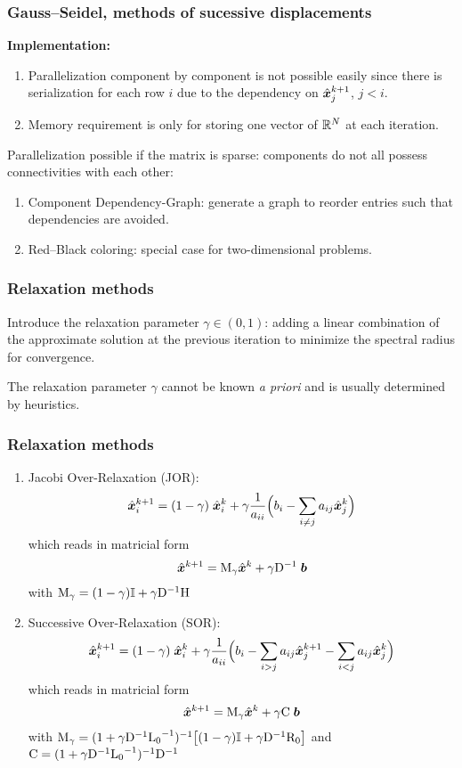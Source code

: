 \begin{frame}
  \frametitle{Gauss--Seidel, methods of sucessive displacements}

\medskip
\textbf{Implementation:}
\begin{enumerate}
\item Parallelization component by component is not possible easily since there is serialization for each row $i$ due to the dependency on $\hat{\boldsymbol x}_j^{k+1}$, $j < i$.
\item Memory requirement is only for storing one vector of ${\mathbb{R}^N}$ at each iteration.
\end{enumerate}

\medskip
Parallelization possible if the matrix is sparse: components do not all possess connectivities with each other:
\begin{enumerate}
\item Component Dependency-Graph: generate a graph to reorder entries such that dependencies are avoided.
\item Red--Black coloring: special case for two-dimensional problems.
\end{enumerate}

\end{frame}

\begin{frame}
  \frametitle{Relaxation methods}

Introduce the relaxation parameter $\gamma \in (0,1)$: adding a linear combination of the approximate solution at the previous iteration to minimize the spectral radius for convergence.

\medskip
The relaxation parameter $\gamma$ cannot be known \textit{a priori} and is usually determined by heuristics.

\end{frame}

\begin{frame}
  \frametitle{Relaxation methods}

\begin{enumerate}
\item Jacobi Over-Relaxation (JOR):
\begin{equation}
\hat{\boldsymbol x}^{k+1}_i = (1 - \gamma)\;\hat{\boldsymbol x}^{k}_i + \gamma \frac{1}{a_{ii}}\Bigl( b_i - \sum_{i\neq j} a_{ij} \hat{\boldsymbol x}^{k}_j \Bigr)
\end{equation}
which reads in matricial form
\[
\hat{\boldsymbol x}^{k+1} = {\mathrm M}_\gamma \hat{\boldsymbol x}^{k} + \gamma{\mathrm D}^{-1}\;{\boldsymbol b}
\]
with ${\mathrm M}_\gamma = (1-\gamma){\mathbf{\mathbb{I}}} + \gamma{\mathrm D}^{-1} {\mathrm H}$

\medskip
\item Successive Over-Relaxation (SOR):
\begin{equation}
\hat{\boldsymbol x}^{k+1}_i = (1-\gamma)\;\hat{\boldsymbol x}^{k}_i + \gamma \frac{1}{a_{ii}}\Bigl( b_i - \sum_{i > j} a_{ij} \hat{\boldsymbol x}^{k+1}_j - \sum_{i < j} a_{ij} \hat{\boldsymbol x}^{k}_j \Bigr)
\end{equation}
which reads in matricial form
\[
\hat{\boldsymbol x}^{k+1} = {\mathrm M}_\gamma \hat{\boldsymbol x}^{k} + \gamma{\mathrm C}\;{\boldsymbol b}
\]
with ${\mathrm M}_\gamma = (1 + \gamma{\mathrm D}^{-1}{\mathrm L_0}^{-1} )^{-1} \bigl[(1-\gamma){\mathbf{\mathbb{I}}} + \gamma{\mathrm D}^{-1} {\mathrm R_0} \bigr]$ and ${\mathrm C} = (1 + \gamma{\mathrm D}^{-1}{\mathrm L_0}^{-1} )^{-1} {\mathrm D}^{-1}$
\end{enumerate}

\end{frame}


